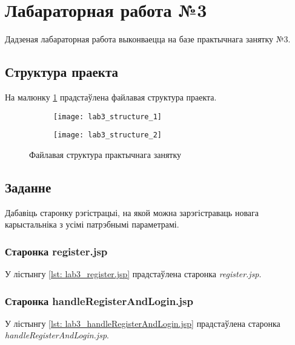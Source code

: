 \section{Лабараторная работа №3}

Дадзеная лабараторная работа выконваецца на базе практычнага занятку №3.

\subsection{Структура праекта}

На малюнку \ref{img: lab3} прадстаўлена файлавая структура праекта.

\begin{figure}[h!]
\centering
\begin{subfigure}{0.5\textwidth}
    \centering
    \texttt{[image: lab3\_structure\_1]}
\end{subfigure}%
\begin{subfigure}{0.5\textwidth}
    \centering
    \texttt{[image: lab3\_structure\_2]}
\end{subfigure}
\caption{Файлавая структура практычнага занятку}
\label{img: lab3} 
\end{figure}

\subsection{Заданне}

Дабавіць старонку рэгістрацыі, на якой можна зарэгістраваць новага
карыстальніка з усімі патрэбнымі параметрамі.

\subsubsection{Старонка register.jsp}

У лістынгу \ref{lst: lab3_register.jsp} прадстаўлена старонка 
\textit{register.jsp}.




\subsubsection{Старонка handleRegisterAndLogin.jsp}

У лістынгу \ref{lst: lab3_handleRegisterAndLogin.jsp} прадстаўлена старонка 
\textit{handleRegisterAndLogin.jsp}.



